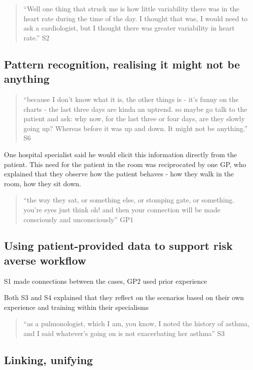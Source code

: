 \documentclass{sigchi}
\begin{document}
\begin{quote}
    ``Well one thing that struck me is how little variability there was in the heart rate during the time of the day. I thought that was, I would need to ask a cardiologist, but I thought there was greater variability in heart rate.'' S2
\end{quote}


\subsection{Pattern recognition, realising it might not be anything}

\begin{quote}
    ``because I don’t know what it is, the other things is - it’s funny on the charts - the last three days are kinda an uptrend. so maybe go talk to the patient and ask: why now, for the last three or four days, are they slowly going up? Whereas before it was up and down. It might not be anything.'' S6
\end{quote}

One hospital specialist said he would elicit this information directly from the patient. This need for the patient in the room was reciprocated by one GP, who explained that they observe how the patient behaves - how they walk in the room, how they sit down. 

\begin{quote}
    ``the way they sat, or something else, or stomping gate, or something. you're eyes just think oh! and then your connection will be made consciously and unconsciously'' GP1
\end{quote}


\subsection{Using patient-provided data to support risk averse workflow}

S1 made connections between the cases, GP2 used prior experience

Both S3 and S4 explained that they reflect on the scenarios based on their own experience and training within their specialisms

\begin{quote}
    ``as a pulmonologist, which I am, you know, I noted the history of asthma, and I said whatever's going on is not exacerbating her asthma'' S3
\end{quote}


\subsection{Linking, unifying}
\end{document}
